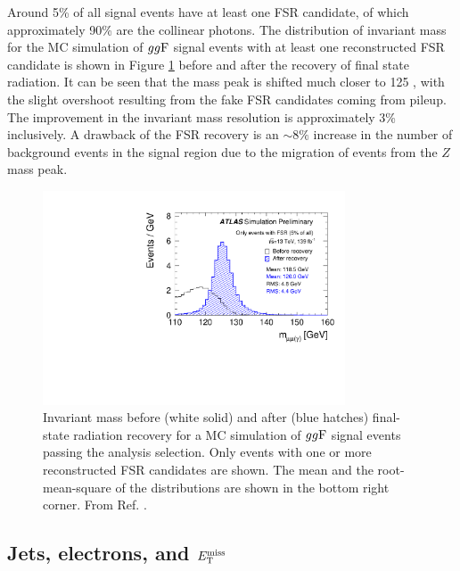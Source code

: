 Around 5\% of all signal events have at least one FSR candidate,
of which approximately 90\% are the collinear photons.
The distribution of invariant mass for the MC simulation of
$gg\text{F}$ signal events with at least one reconstructed FSR
candidate is shown in Figure \ref{fig:hmumu:fsr}
before and after the recovery of final state radiation.
It can be seen that the mass peak is shifted much closer to
125 \GeV, with the slight overshoot resulting from the fake
FSR candidates coming from pileup. The improvement in the
invariant mass resolution is approximately 3\% inclusively.
A drawback of the FSR recovery is an $\sim 8\%$ increase in the
number of background events in the signal region due to the
migration of events from the $Z$ mass peak.
\begin{figure}[h!]
  \centering
  \includegraphics[width=0.8\textwidth]{figures/hmumu/FSR_fsr}
  \caption[Final state radiation recovery]{Invariant mass before
  (white solid) and after (blue hatches) final-state radiation
  recovery for a MC simulation of $gg\text{F}$ signal events passing
  the analysis selection. Only events with one or more
  reconstructed FSR candidates are shown. The mean and the
  root-mean-square of the distributions are shown in the bottom
  right corner. From Ref. \cite{ATLAS-CONF-2019-028}.}
  \label{fig:hmumu:fsr}
\end{figure}

\subsection{Jets, electrons, and $E_\text{T}^\text{miss}$}

